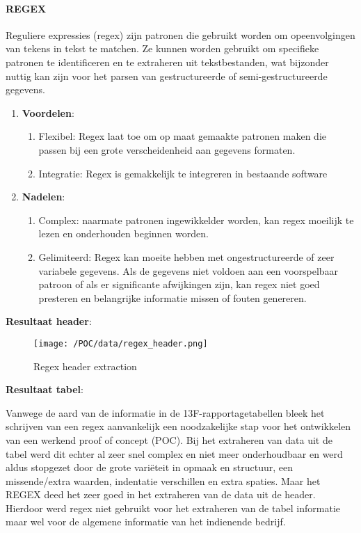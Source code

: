 \paragraph{REGEX}
Reguliere expressies (regex) zijn patronen die gebruikt worden om opeenvolgingen van tekens in tekst te matchen. Ze kunnen worden gebruikt om specifieke patronen te identificeren en te extraheren uit tekstbestanden, wat bijzonder nuttig kan zijn voor het parsen van gestructureerde of semi-gestructureerde gegevens.
\begin{enumerate}
    \item \textbf{Voordelen}:
    \begin{enumerate}
        \item Flexibel: Regex laat toe om op maat gemaakte patronen maken die passen bij een grote verscheidenheid aan gegevens formaten.
        \item Integratie: Regex is gemakkelijk te integreren in bestaande software
    \end{enumerate}
    \item \textbf{Nadelen}:
    \begin{enumerate}
        \item Complex: naarmate patronen ingewikkelder worden, kan regex moeilijk te lezen en onderhouden beginnen worden.
        \item Gelimiteerd: Regex kan moeite hebben met ongestructureerde of zeer variabele gegevens. Als de gegevens niet voldoen aan een voorspelbaar patroon of als er significante afwijkingen zijn, kan regex niet goed presteren en belangrijke informatie missen of fouten genereren.
    \end{enumerate}
\end{enumerate}

\textbf{Resultaat header}: 
\begin{figure}[H]
    \centering        
    \texttt{[image: /POC/data/regex\_header.png]}
    \caption{Regex header extraction}
    \label{fig:regex header}
\end{figure}
\textbf{Resultaat tabel}: 

Vanwege de aard van de informatie in de 13F-rapportagetabellen bleek het schrijven van een regex aanvankelijk een noodzakelijke stap voor het ontwikkelen van een werkend proof of concept (POC). Bij het extraheren van data uit de tabel werd dit echter al zeer snel complex en niet meer onderhoudbaar en werd aldus stopgezet door de grote variëteit in opmaak en structuur, een missende/extra waarden, indentatie verschillen en extra spaties. Maar het REGEX deed het zeer goed in het extraheren van de data uit de header. Hierdoor werd regex niet gebruikt voor het extraheren van de tabel informatie maar wel voor de algemene informatie van het indienende bedrijf.

